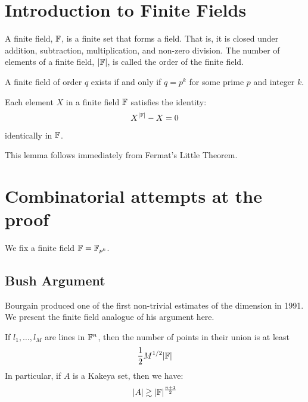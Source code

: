 \section{Introduction to Finite Fields}
\begin{definition}
    A finite field, $\mathbb F$, is a finite set that forms a field. That is, it is closed under addition, subtraction, multiplication, and non-zero division. 
    The number of elements of a finite field, $|\mathbb F|$, is called the order of the finite field.
\end{definition}
A finite field of order $q$ exists if and only if $q = p^k$ for some prime $p$ and integer $k$. 

\begin{lemma}
    Each element $X$ in a finite field $\mathbb F$ satisfies the identity:
    $$X^{|\mathbb F|} - X =0$$
    identically in $\mathbb F$.
    \label{lem:finite-fields-poly-identity}
\end{lemma}
This lemma follows immediately from Fermat's Little Theorem.





\section{Combinatorial attempts at the proof}
We fix a finite field $\mathbb F = \mathbb F_{p^k}$.
\subsection{Bush Argument}
Bourgain produced one of the first non-trivial estimates of the dimension in 1991.\cite{BUSH1991} We present the finite field analogue of his argument here.\cite{GUTH2016}
\begin{theorem}
If $l_1, \dots, l_M$ are lines in $\mathbb F^n$, then the number of points in their union is at least 
$$\frac12 M^{1/2} |\mathbb F|$$
In particular, if $A$ is a Kakeya set, then we have:
$$|A| \gtrsim |\mathbb F|^{\frac{n+1}{2}}$$
\end{theorem}



